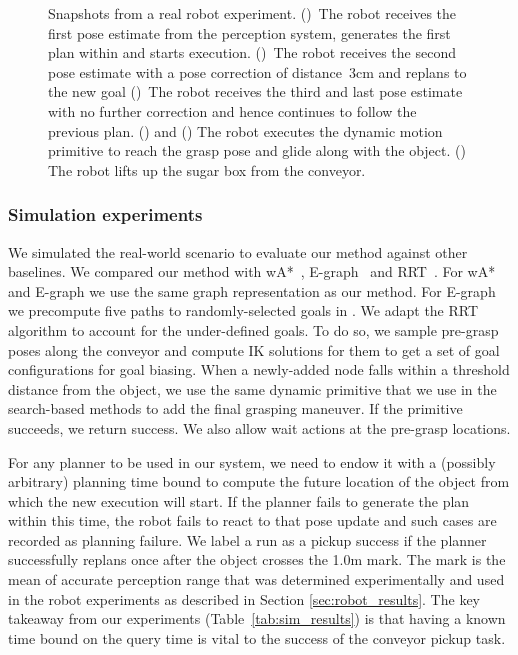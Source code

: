 \documentclass[a4paper]{report}
\begin{document}
\begin{figure}[t]
\begin{subfigure}{0.48\textwidth}
        \caption{}
        \label{fig:demo6}
    \end{subfigure}
    \caption{\CaptionTextSize
    Snapshots from a real robot experiment.
    ()~The robot receives the first pose estimate from the perception system, generates the first plan within \Tbound and starts execution.
    ()~The robot receives the second pose estimate with a pose correction of distance~3cm and replans to the new goal
    ()~The robot receives the third and last pose estimate with no further correction and hence continues to follow the previous plan.
    () and () The robot executes the dynamic motion primitive to reach the grasp pose and glide along with the object.
    () The robot lifts up the sugar box from the conveyor.
    }
    \label{fig:demo}
\end{figure}

\subsubsection{Simulation experiments}
We simulated the real-world scenario to evaluate our method against other baselines. We compared our method with wA*~\cite{pohl1970heuristic}, E-graph~\cite{PCCL12} and RRT~\cite{lavalle1998rapidly}. 
For wA* and E-graph we use the same graph representation as our method. 
For E-graph we precompute five paths to randomly-selected goals in \Gfull. 
We adapt the RRT algorithm to account for the under-defined goals. To do so, we sample pre-grasp poses along the conveyor 
and compute IK solutions for them to get a set of goal configurations for goal biasing. 
When a newly-added node falls within a threshold distance from the object, we use the same dynamic primitive that we use in the search-based methods to add the final grasping maneuver. If the primitive succeeds, we return success. We also allow wait actions at the pre-grasp locations.

For any planner to be used in our system, we need to endow it with a (possibly arbitrary) planning time bound to compute the future location of the object from which the new execution will start.
%
If the planner fails to generate the plan within this time, the robot fails to react to that pose update and such cases are recorded as planning failure. 
%
We label a run as a pickup success if the planner successfully replans once after the object crosses the 1.0m mark. The mark is the mean of accurate perception range that was determined experimentally and used in the robot experiments as described in Section \ref{sec:robot_results}.
%
%
The key takeaway from our experiments (Table~\ref{tab:sim_results}) is that having a known time bound on the query time is vital to the success of the conveyor pickup task.
\end{document}
